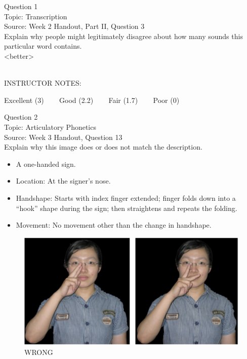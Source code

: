 \documentclass[12pt]{article}
\begin{document}
\begin{center}
\textbf{{\color{blue}{\HUGE START OF EXAM\\}}}

\textbf{{\color{blue}{\HUGE Student ID: 16758\\}}}

\textbf{{\color{blue}{\HUGE \\}}}

\end{center}
\newpage

{\large Question 1}\\

Topic: Transcription\\
Source: Week 2 Handout, Part II, Question 3\\

Explain why people might legitimately disagree about how many sounds this particular word contains.\\

<better>


~\\
INSTRUCTOR NOTES: 


\vfill
Excellent (3) ~~~ Good (2.2) ~~~ Fair (1.7) ~~~ Poor (0)
\newpage

{\large Question 2}\\

Topic: Articulatory Phonetics\\
Source: Week 3 Handout, Question 13\\

Explain why this image does or does not match the description.\\

\begin{itemize} \item A one-handed sign. \item Location: At the signer’s nose. \item Handshape: Starts with index finger extended; finger folds down into a “hook” shape during the sign; then straightens and repeats the folding. \item Movement: No movement other than the change in handshape. \end{itemize}

\begin{figure}[H]
\includegraphics{../images/taiwansign_wrong.png}
\caption{WRONG}
\end{figure}
\end{document}
